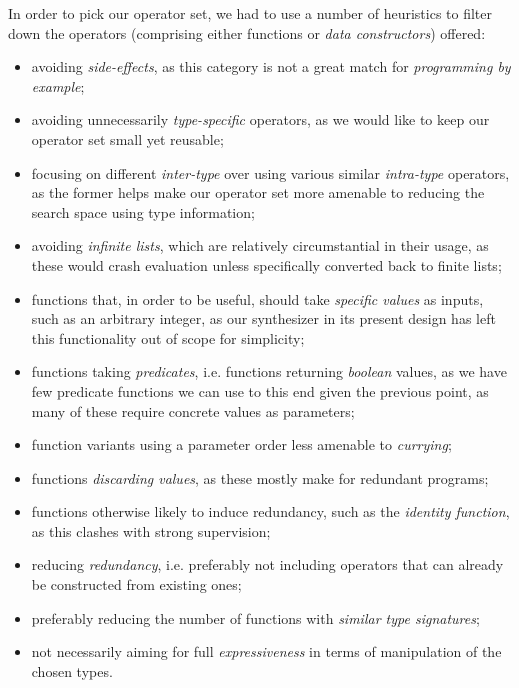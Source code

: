 \documentclass{article}
\begin{document}
In order to pick our operator set, %
we had to use a number of heuristics to filter down the operators (comprising either functions or \emph{data constructors}) offered:
\begin{itemize}
    \item avoiding \emph{side-effects},
    as this category is not a great match for \emph{programming by example};
    \item avoiding unnecessarily \emph{type-specific} operators, as we would like to keep our operator set small yet reusable;
    \item focusing on different \emph{inter-type} over using various similar \emph{intra-type} operators, as the former helps make our operator set more amenable to reducing the search space using type information;
    \item avoiding \emph{infinite lists}, which are relatively circumstantial in their usage, as these would crash evaluation unless specifically converted back to finite lists;
    \item functions that, in order to be useful, should take \emph{specific values} as inputs, such as an arbitrary integer, as our synthesizer in its present design has left this functionality out of scope for simplicity;
    \item functions taking \emph{predicates}, i.e. functions returning \emph{boolean} values, as we have few predicate functions we can use to this end given the previous point, as many of these require concrete values as parameters;
    \item function variants using a parameter order less amenable to \emph{currying};
    \item functions \emph{discarding values}, as these mostly make for redundant programs;
    \item
    functions otherwise likely to induce redundancy, such as the \emph{identity function}, as this clashes with strong supervision;
    \item reducing \emph{redundancy}, i.e. preferably not including operators that can already be constructed from existing ones;
    \item preferably reducing the number of functions with \emph{similar type signatures};
    \item not necessarily aiming for full \emph{expressiveness} in terms of manipulation of the chosen types.
\end{itemize}
\end{document}

